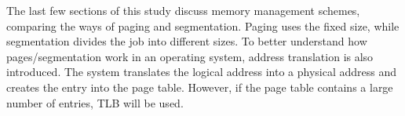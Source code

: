 \documentclass[doc,natbib,12pt]{apa6}
\begin{document}
	The last few sections of this study discuss memory management schemes, comparing the ways of paging and segmentation. Paging uses the fixed size, while segmentation divides the job into different sizes. To better understand how pages/segmentation work in an operating system, address translation is also introduced. The system translates the logical address into a physical address and creates the entry into the page table. However, if the page table contains a large number of entries, TLB will be used.
	
	
	
	
	
	
	
	
	
	
	
	
	
	\newpage 
	
	
\end{document}
